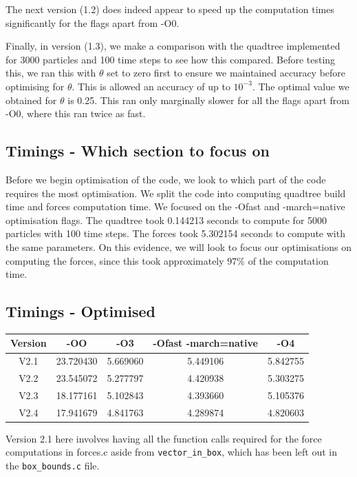 \documentclass{article}
\begin{document}
The next version (1.2) does indeed appear to speed up the computation times significantly for the flags apart from -O0.\vspace{0.3cm}

Finally, in version (1.3), we make a comparison with the quadtree implemented for 3000 particles and 100 time steps to see how this compared. Before testing this, we ran this with $\theta$ set to zero first to ensure we maintained accuracy before optimising for $\theta$. This is allowed an accuracy of up to $10^{-3}$. The optimal value we obtained for $\theta$ is 0.25. This ran only marginally slower for all the flags apart from -O0, where this ran twice as fast.
\subsection{Timings - Which section to focus on}
Before we begin optimisation of the code, we look to which part of the code requires the most optimisation. We split the code into computing quadtree build time and forces computation time. We focused on the -Ofast and -march=native optimisation flags. The quadtree took 0.144213 seconds to compute for 5000 particles with 100 time steps. The forces took 5.302154 seconds to compute with the same parameters. On this evidence, we will look to focus our optimisations on computing the forces, since this took approximately $97\%$ of the computation time.
\subsection{Timings - Optimised}
\begin{center}
\begin{tabular}{|c|c|c|c|c|}
\hline
Version & -OO & -O3 & -Ofast -march=native & -O4\\
\hline
V2.1 & 23.720430 & 5.669060 & 5.449106 & 5.842755\\
\hline
V2.2 & 23.545072 & 5.277797 & 4.420938 & 5.303275\\
\hline
V2.3 & 18.177161 & 5.102843 & 4.393660 & 5.105376\\
\hline
V2.4 & 17.941679 & 4.841763 & 4.289874 & 4.820603\\
\hline
\end{tabular}
\end{center}
Version 2.1 here involves having all the function calls required for the force computations in forces.c aside from \verb|vector_in_box|, which has been left out in the \verb|box_bounds.c| file.\vspace{0.3cm}
\end{document}

